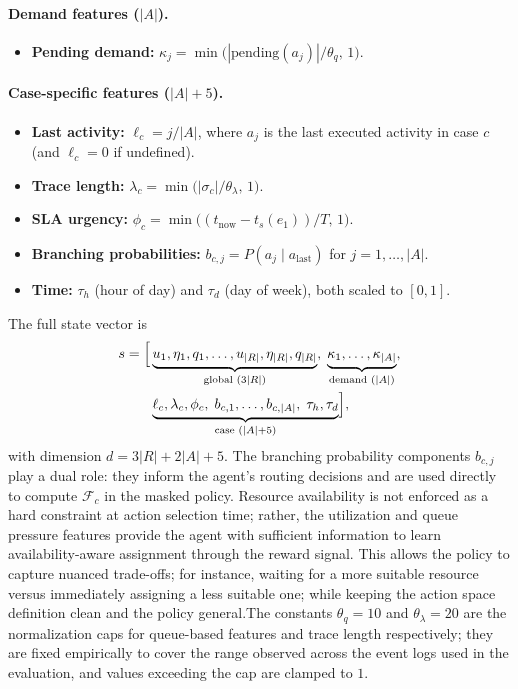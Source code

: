 \documentclass[runningheads]{llncs}
\begin{document}
\paragraph{Demand features ($|A|$).}
\begin{itemize}[label=$\bullet$, itemsep=0pt, topsep=1pt]
  \item \textbf{Pending demand:} $\kappa_j = \min\!\bigl(|\mathrm{pending}(a_j)|/\theta_q,\, 1\bigr)$.
\end{itemize}

\paragraph{Case-specific features ($|A|+5$).}
\begin{itemize}[label=$\bullet$, itemsep=0pt, topsep=1pt]
  \item \textbf{Last activity:} $\ell_c = j/|A|$, where $a_j$ is the last executed activity in case $c$ (and $\ell_c=0$ if undefined).
  \item \textbf{Trace length:} $\lambda_c = \min\!\bigl(|\sigma_c|/\theta_\lambda,\, 1\bigr)$.
  \item \textbf{SLA urgency:} $\phi_c = \min\!\bigl((t_{\mathrm{now}}-t_s(e_1))/T,\, 1\bigr)$.
  \item \textbf{Branching probabilities:} $b_{c,j} = P(a_j \mid a_{\mathrm{last}})$ for $j=1,\dots,|A|$.
  \item \textbf{Time:} $\tau_h$ (hour of day) and $\tau_d$ (day of week), both scaled to $[0,1]$.
\end{itemize}

The full state vector is
\begin{equation}
\label{eq:state_vector}
\begin{aligned}
s=\Bigl[&
\underbrace{u_1,\eta_1,q_1,\dots,u_{|R|},\eta_{|R|},q_{|R|}}_{\text{global }(3|R|)},\;
\underbrace{\kappa_1,\dots,\kappa_{|A|}}_{\text{demand }(|A|)},\\
&
\underbrace{\ell_c,\lambda_c,\phi_c,\; b_{c,1},\dots,b_{c,|A|},\; \tau_h,\tau_d}_{\text{case }(|A|+5)}
\Bigr],
\end{aligned}
\end{equation}
with dimension $d=3|R|+2|A|+5$. The branching probability components 
$b_{c,j}$ play a dual role: they inform the agent's routing decisions and 
are used directly to compute $\mathcal{F}_c$ in the masked policy. Resource 
availability is not enforced as a hard constraint at action selection time; 
rather, the utilization and queue pressure features provide the agent with 
sufficient information to learn availability-aware assignment through the 
reward signal. This allows the policy to capture nuanced trade-offs; for 
instance, waiting for a more suitable resource versus immediately assigning 
a less suitable one; while keeping the action space definition clean and 
the policy general.The constants $\theta_q = 10$ and $\theta_\lambda = 20$ are the normalization 
caps for queue-based features and trace length respectively; they are fixed 
empirically to cover the range observed across the event logs used in the 
evaluation, and values exceeding the cap are clamped to $1$.
\end{document}
